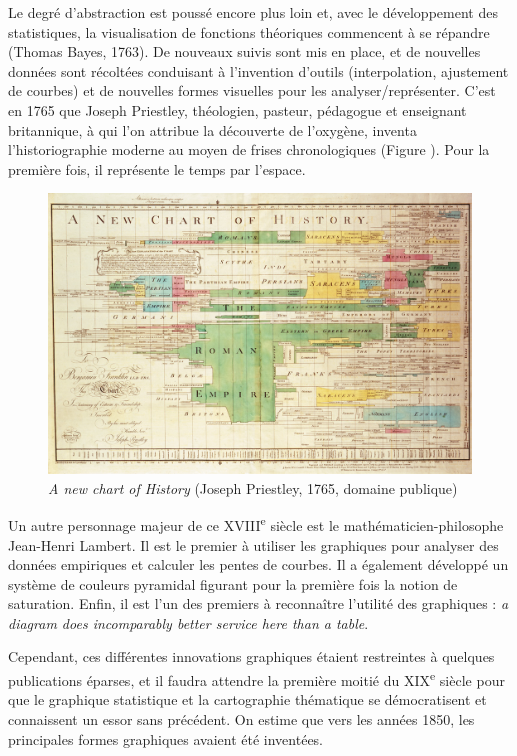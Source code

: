 \documentclass[]{article}
\begin{document}
Le degré d'abstraction est poussé encore plus loin et, avec le développement des statistiques, la visualisation de fonctions théoriques commencent à se répandre (Thomas Bayes, 1763). De nouveaux suivis sont mis en place, et de nouvelles données sont récoltées conduisant à l'invention d'outils (interpolation, ajustement de courbes) et de nouvelles formes visuelles pour les analyser/représenter. C'est en 1765 que Joseph Priestley, théologien, pasteur, pédagogue et enseignant britannique, à qui l'on attribue la découverte de l'oxygène, inventa l'historiographie moderne au moyen de frises chronologiques (Figure \citet{fig:priestley}). Pour la première fois, il représente le temps par l'espace.

\begin{figure}
\hypertarget{fig:priestley}{%
\centering
\includegraphics{img/chap1/priestley.jpg}
\caption{\emph{A new chart of History} (Joseph Priestley, 1765, domaine publique)}\label{fig:priestley}
}
\end{figure}

Un autre personnage majeur de ce XVIII\textsuperscript{e} siècle est le mathématicien-philosophe Jean-Henri Lambert. Il est le premier à utiliser les graphiques pour analyser des données empiriques et calculer les pentes de courbes. Il a également développé un système de couleurs pyramidal figurant pour la première fois la notion de saturation. Enfin, il est l'un des premiers à reconnaître l'utilité des graphiques : \emph{a diagram does incomparably better service here than a table}.

Cependant, ces différentes innovations graphiques étaient restreintes à quelques publications éparses, et il faudra attendre la première moitié du XIX\textsuperscript{e} siècle pour que le graphique statistique et la cartographie thématique se démocratisent et connaissent un essor sans précédent. On estime que vers les années 1850, les principales formes graphiques avaient été inventées.
\end{document}

